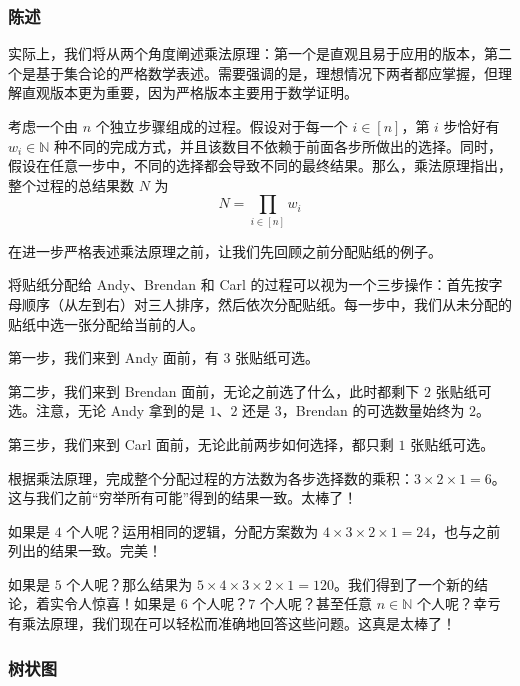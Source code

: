 \subsubsection*{陈述}

实际上，我们将从两个角度阐述乘法原理：第一个是直观且易于应用的版本，第二个是基于集合论的严格数学表述。需要强调的是，理想情况下两者都应掌握，但理解直观版本更为重要，因为严格版本主要用于数学证明。

\begin{proposition}
    考虑一个由 $n$ 个独立步骤组成的过程。假设对于每一个 $i \in [n]$，第 $i$ 步恰好有 $w_i \in \mathbb{N}$ 种不同的完成方式，并且该数目不依赖于前面各步所做出的选择。同时，假设在任意一步中，不同的选择都会导致不同的最终结果。那么，乘法原理指出，整个过程的总结果数 $N$ 为
    \[N = \prod_{i \in [n]} w_i\]
\end{proposition}

在进一步严格表述乘法原理之前，让我们先回顾之前分配贴纸的例子。

\begin{example}
    将贴纸分配给 Andy、Brendan 和 Carl 的过程可以视为一个三步操作：首先按字母顺序（从左到右）对三人排序，然后依次分配贴纸。每一步中，我们从未分配的贴纸中选一张分配给当前的人。

    第一步，我们来到 Andy 面前，有 $3$ 张贴纸可选。

    第二步，我们来到 Brendan 面前，无论之前选了什么，此时都剩下 $2$ 张贴纸可选。注意，无论 Andy 拿到的是 $1$、$2$ 还是 $3$，Brendan 的可选数量始终为 $2$。

    第三步，我们来到 Carl 面前，无论此前两步如何选择，都只剩 $1$ 张贴纸可选。

    根据乘法原理，完成整个分配过程的方法数为各步选择数的乘积：$3 \times 2 \times 1 = 6$。这与我们之前``穷举所有可能''得到的结果一致。太棒了！

    如果是 $4$ 个人呢？运用相同的逻辑，分配方案数为 $4 \times 3 \times 2 \times 1 = 24$，也与之前列出的结果一致。完美！

    如果是 $5$ 个人呢？那么结果为 $5 \times 4 \times 3 \times 2 \times 1 = 120$。我们得到了一个新的结论，着实令人惊喜！如果是 $6$ 个人呢？$7$ 个人呢？甚至任意 $n \in \mathbb{N}$ 个人呢？幸亏有乘法原理，我们现在可以轻松而准确地回答这些问题。这真是太棒了！
\end{example}

\subsubsection*{树状图}

